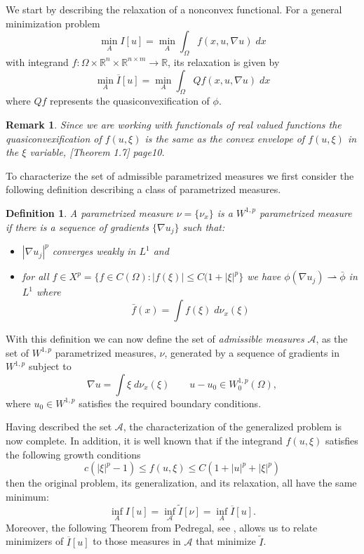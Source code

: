 \documentclass[11pt]{article}
\newcommand{\R}{\mathbb{R}}
\theoremstyle{plain}
\newtheorem{Remark}[Lemma]{Remark}
\newtheorem{Definition}[Lemma]{Definition}
\begin{document}
We start by describing the relaxation of a nonconvex functional. For a general minimization problem 
\[ \min_A I[u] = \min_A \int_\Omega f(x,u,\nabla u) \;dx\]
with integrand $f: \Omega \times \R^n \times \R^{n \times m} \rightarrow \R$, its relaxation is given by
\[ \min_A \overline{I} [u] = \min_A  \int_\Omega Qf(x,u, \nabla u) \;dx\]
where $Qf$ represents the quasiconvexification of $\phi$. 

 \begin{Remark}
 Since we are working with functionals of real valued functions the quasiconvexification of $f(u, \xi)$ is the same as the convex envelope of $f(u, \xi)$  in the $\xi$ variable, \cite{dacorogna2007direct}[Theorem 1.7] page10.
 \end{Remark}
 
To characterize the set of admissible parametrized measures we first consider the following definition describing a class of parametrized measures.
\begin{Definition}
A parametrized measure $\nu=\{ \nu_x\}$ is a $W^{1,p}$ parametrized measure if there is a sequence of gradients $\{ \nabla u_j\}$ such that:
\begin{itemize}
\item $|\nabla u_j|^p$ converges weakly in $L^1$ and  
\item for all $f \in X^p = \{ f \in C(\Omega) : | f(\xi)| \leq C(1 + |\xi|^p\}$ we have $\phi(\nabla u_j) \rightharpoonup \bar{\phi}$ in $L^1$ where
 \[ \bar{f}(x) = \int f(\xi) \; d\nu_x(\xi)\] 
\end{itemize}
\end{Definition}

With this definition we can now define the set of {\it admissible measures} $\mathscr{A}$, as the set of $W^{1,p}$ parametrized measures, $\nu$, generated by a sequence of gradients in $W^{1,p}$ subject to 
\[ \nabla u = \int \xi \;d\nu_x(\xi)\qquad u- u_0 \in W_0^{1,p}(\Omega), \]
where $u_0 \in W^{1,p}$ satisfies the required boundary conditions.

Having described the set $\mathscr{A}$, the characterization of the generalized problem is now complete. In addition, it is well known that if the integrand $f(u, \xi) $ satisfies the following growth conditions
\[ c(|\xi|^p - 1) \leq f(u,\xi) \leq C( 1+ |u|^p +|\xi|^p) \]
then the original problem, its generalization, and its relaxation, all have the same minimum:
\[ \inf_A I[u] = \inf_\mathscr{A} \tilde{I}[\nu] = \inf_A \overline{I}[u]. \]
Moreover, the following Theorem from Pedregal, see \cite{pedregal2012parametrized} , allows us to relate minimizers of $\overline{I}[u]$ to those measures in $\mathscr{A}$ that minimize $\tilde{I}$.
\end{document}

